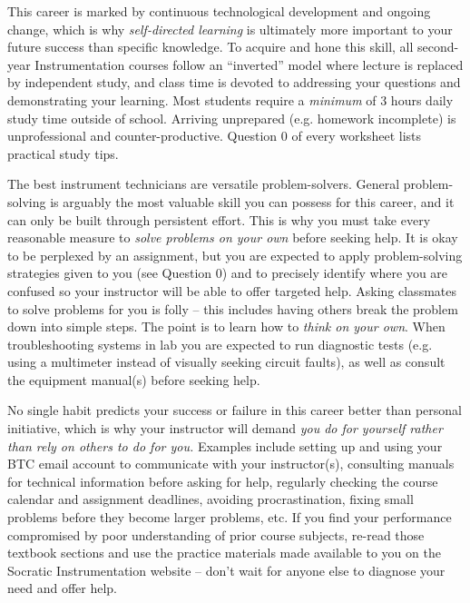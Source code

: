 \vskip 10pt

\noindent
{} This career is marked by continuous technological development and ongoing change, which is why {\it self-directed learning} is ultimately more important to your future success than specific knowledge.  To acquire and hone this skill, all second-year Instrumentation courses follow an ``inverted'' model where lecture is replaced by independent study, and class time is devoted to addressing your questions and demonstrating your learning.  Most students require a {\it minimum} of 3 hours daily study time outside of school.  Arriving unprepared (e.g. homework incomplete) is unprofessional and counter-productive.  Question 0 of every worksheet lists practical study tips.

\vskip 10pt

\noindent
{} The best instrument technicians are versatile problem-solvers.  General problem-solving is arguably the most valuable skill you can possess for this career, and it can only be built through persistent effort.  This is why you must take every reasonable measure to {\it solve problems on your own} before seeking help.  It is okay to be perplexed by an assignment, but you are expected to apply problem-solving strategies given to you (see Question 0) and to precisely identify where you are confused so your instructor will be able to offer targeted help.  Asking classmates to solve problems for you is folly -- this includes having others break the problem down into simple steps.  The point is to learn how to {\it think on your own}.  When troubleshooting systems in lab you are expected to run diagnostic tests (e.g. using a multimeter instead of visually seeking circuit faults), as well as consult the equipment manual(s) before seeking help.  

\vskip 10pt

\noindent
{} No single habit predicts your success or failure in this career better than personal initiative, which is why your instructor will demand {\it you do for yourself rather than rely on others to do for you.}  Examples include setting up and using your BTC email account to communicate with your instructor(s), consulting manuals for technical information before asking for help, regularly checking the course calendar and assignment deadlines, avoiding procrastination, fixing small problems before they become larger problems, etc.  If you find your performance compromised by poor understanding of prior course subjects, re-read those textbook sections and use the practice materials made available to you on the Socratic Instrumentation website -- don't wait for anyone else to diagnose your need and offer help.







